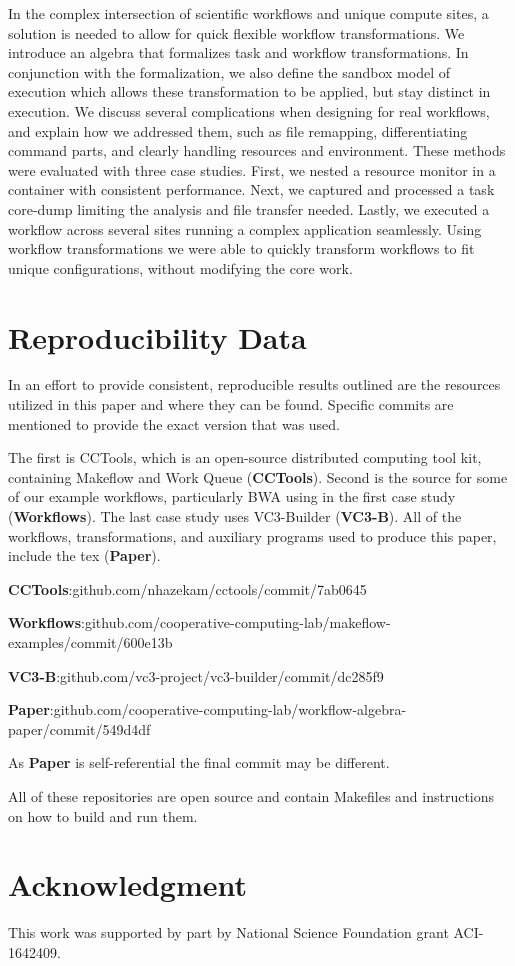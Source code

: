 \documentclass[conference]{IEEEtran}
\begin{document}
In the complex intersection of scientific
workflows and unique compute sites,
a solution is needed to allow for
quick flexible workflow transformations.
We introduce an algebra that formalizes 
task and workflow transformations. 
In conjunction with the formalization,
we also define the sandbox model of execution
which allows these transformation to be applied,
but stay distinct in execution. 
We discuss several 
complications when designing for real workflows,
and explain how we addressed them, such as 
file remapping, differentiating command parts,
and clearly handling resources and environment.
These methods were evaluated with three case studies.
First, we nested a resource monitor in a container
with consistent performance.
Next, we captured and processed a task core-dump
limiting the analysis and file transfer needed.
Lastly, we executed a workflow across several sites running a 
complex application seamlessly.
Using workflow transformations
we were able to quickly transform workflows to fit 
unique configurations, without modifying the core work.



\section{Reproducibility Data}

In an effort to provide consistent, reproducible results outlined are the
resources utilized in this paper and where they can be found.
Specific commits are mentioned to provide the exact version that was used.

The first is CCTools, which is an open-source distributed computing 
tool kit, containing Makeflow and Work Queue (\textbf{CCTools}).
Second is the source for some of our example workflows,
particularly BWA using in the first case study (\textbf{Workflows}).
The last case study uses VC3-Builder (\textbf{VC3-B}).
All of the workflows, transformations, and auxiliary
programs used to produce this paper, include the tex 
(\textbf{Paper}).
\begin{framed}
\noindent
{\small \textbf{CCTools}:github.com/nhazekam/cctools/commit/7ab0645}

\noindent
{\small \textbf{Workflows}:github.com/cooperative-computing-lab/makeflow-examples/commit/600e13b}

\noindent
{\small \textbf{VC3-B}:github.com/vc3-project/vc3-builder/commit/dc285f9}

\noindent
{\small \textbf{Paper}:github.com/cooperative-computing-lab/workflow-algebra-paper/commit/549d4df}
\end{framed}
\noindent
As \textbf{Paper} is self-referential the final commit may be different.


All of these repositories are open source and contain Makefiles
and instructions on how to build and run them.



\section*{Acknowledgment}

This work was supported by part by National Science Foundation grant ACI-1642409.




\end{document}

